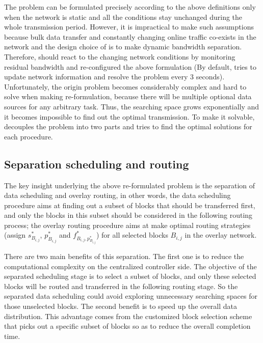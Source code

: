The problem can be formulated precisely according to the above definitions only when the network is static and all the conditions stay unchanged during the whole transmission period. However, it is impractical to make such assumptions because bulk data transfer and constantly changing online traffic co-exists in the network and the design choice of \name is to make dynamic bandwidth separation. Therefore, \name should react to the changing network conditions by monitoring residual bandwidth and re-configured the above formulation (By default, \name tries to update network information and resolve the problem every 3 seconds). Unfortunately, the origin problem becomes considerably complex and hard to solve when making re-formulation, because there will be multiple optional data sources for any arbitrary task. Thus, the searching space grows exponentially and it becomes impossible to find out the optimal transmission. To make it solvable, \name decouples the problem into two parts and tries to find the optimal solutions for each procedure.

\subsection{Separation scheduling and routing}
\label{subsec:logic:separation}

The key insight underlying the above re-formulated problem is the separation of data scheduling and overlay routing, in other words, the data scheduling procedure aims at finding out a subset of blocks that should be transferred first, and only the blocks in this subset should be considered in the following routing process; the overlay routing procedure aims at make optimal routing strategies (assign $s_{B_{i,j}}^*$, $p_{B_{i,j}}^*$ and $f^*_{B_{i,j},p_{B_{i,j}}^*}$) for all selected blocks $B_{i,j}$ in the overlay network.

There are two main benefits of this separation. The first one is to reduce the computational complexity on the centralized controller side. The objective of the separated scheduling stage is to select a subset of blocks, and only these selected blocks will be routed and transferred in the following routing stage. So the separated data scheduling could avoid exploring unnecessary searching spaces for those unselected blocks. The second benefit is to speed up the overall data distribution. This advantage comes from the customized block selection scheme that picks out a specific subset of blocks so as to reduce the overall completion time.

